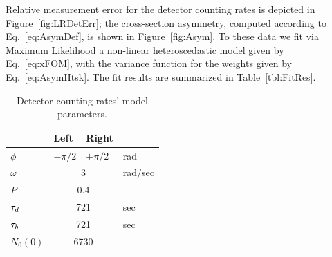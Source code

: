\documentclass{jacow}
\begin{document}
Relative measurement error for the detector counting rates is depicted in Figure~\ref{fig:LRDetErr}; the cross-section asymmetry, computed according to Eq.~\eqref{eq:AsymDef}, is shown in Figure~\ref{fig:Asym}.
To these data we fit via Maximum Likelihood a non-linear heteroscedastic model %
given by Eq.~\eqref{eq:xFOM}, with the variance function for the weights given by Eq.~\eqref{eq:AsymHtsk}. The fit results are summarized in Table~\ref{tbl:FitRes}.
\begin{table}[h]
	\caption{Detector counting rates' model parameters.\label{tbl:DetCntRtParam}}
	\centering
	\begin{tabular}{llll}
		\hline
		&   Left   &     Right     &  \\ \hline
		$\phi$  & $-\pi/2$ &   $+\pi/2$    &   rad   \\
		$\omega$ &  \multicolumn{2}{c}{3}   & rad/sec \\
		$P$    & \multicolumn{2}{c}{0.4}  &  \\
		$\tau_d$  & \multicolumn{2}{c}{721}  &   sec   \\
		$\tau_b$  & \multicolumn{2}{c}{721}  &   sec   \\
		$N_0(0)$ & \multicolumn{2}{c}{6730} &  \\ \hline
	\end{tabular}
\end{table}
\end{document}
